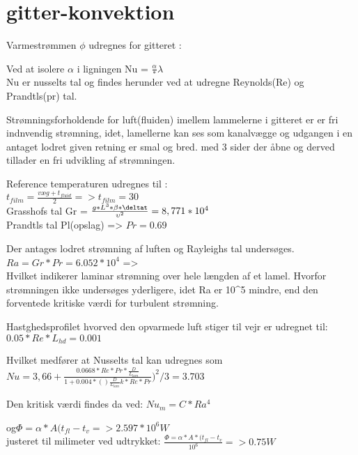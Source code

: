 \section{gitter-konvektion}

Varmestrømmen $\phi$ udregnes for gitteret : 

Ved at isolere $\alpha$ i ligningen Nu = $\frac{\alpha}*{\lambda}$ \\
Nu er nusselts tal og findes herunder ved at udregne Reynolds(Re) og Prandtls(pr) tal.


Strømningsforholdende for luft(fluiden) imellem lammelerne i gitteret er er fri indnvendig strømning, idet, lamellerne kan ses som kanalvægge og udgangen i en antaget lodret given retning er smal og bred. med 3 sider der åbne og derved tillader en fri udvikling af strømningen. 

Reference temperaturen udregnes til : 
\\$t_{film} = \frac{{væg}+t_{fluid}}{2} => t_{film}=30$
\\Grasshofs tal Gr = $\frac{g*L^3*\beta*{\deltat}}{\upsilon^2} = 8,771*10^4$
\\Prandtls tal Pl(opslag) => $Pr=0.69$


Der antages lodret  strømning af luften og Rayleighs tal undersøges.\\
$ Ra = Gr*Pr = 6.052*10^4$ => \\ 
Hvilket indikerer laminar strømning over hele længden af et lamel. Hvorfor strømningen ikke undersøges yderligere, idet Ra er 10^5 mindre, end den forventede kritiske værdi for turbulent strømning.

Hastghedsprofilet hvorved den opvarmede luft stiger til vejr er udregnet til: 
$0.05*Re*L_{hd} = 0.001 $

Hvilket medfører at Nusselts tal kan udregnes som \\ 
$Nu = 3,66+ \frac{0.0668*Re*Pr*\frac{D}{L_{lam}}}{1+0.004*()\frac{D}{L_{lam}}k *Re*Pr})^2/3 = 3.703$


Den kritisk værdi findes da ved: $Nu_m = C*Ra^4$

og$ \Phi = \alpha*A(t_{fl}-t_v =>2.597*10^6 W $\\ 
justeret til milimeter ved udtrykket: $\frac{\Phi = \alpha*A*(t_{fl}-t_v}{10^6} =>0.75 W$
